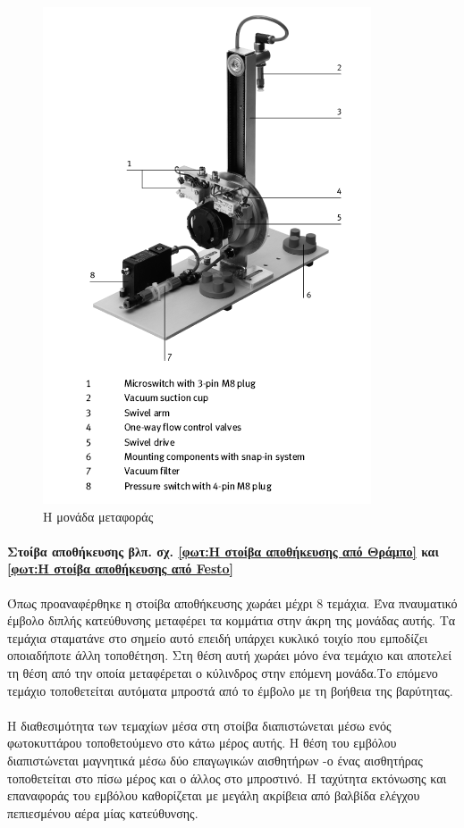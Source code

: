 \documentclass[a4paper,12pt,twoside]{report}
\begin{document}
{				\begin{figure}[hp]
					\centering
					\includegraphics[scale=0.75]{ChangerModuleParts.png}
					\caption{Η μονάδα μεταφοράς \cite{FestoChangerModuleManual}}
					\label{φωτ:Η μονάδα μεταφοράς από Festo}
				\end{figure}
							

				
				\paragraph{Στοίβα αποθήκευσης {\footnotesize βλπ. σχ. \ref{φωτ:Η στοίβα αποθήκευσης από Θράμπο} και \ref{φωτ:Η στοίβα αποθήκευσης από Festo}}} {Όπως προαναφέρθηκε η στοίβα αποθήκευσης χωράει μέχρι 8 τεμάχια. Ένα πναυματικό έμβολο διπλής κατεύθυνσης μεταφέρει τα κομμάτια στην άκρη της μονάδας αυτής. Τα τεμάχια σταματάνε στο σημείο αυτό επειδή υπάρχει κυκλικό τοιχίο που εμποδίζει οποιαδήποτε άλλη τοποθέτηση. Στη θέση αυτή χωράει μόνο ένα τεμάχιο και αποτελεί τη θέση από την οποία μεταφέρεται ο κύλινδρος στην επόμενη μονάδα.Το επόμενο τεμάχιο τοποθετείται αυτόματα μπροστά από το έμβολο με τη βοήθεια της βαρύτητας.
				}
				\paragraph{} {Η διαθεσιμότητα των τεμαχίων μέσα στη στοίβα διαπιστώνεται μέσω ενός φωτοκυττάρου τοποθετούμενο στο κάτω μέρος αυτής. Η θέση του εμβόλου διαπιστώνεται μαγνητικά μέσω δύο επαγωγικών αισθητήρων -ο ένας αισθητήρας τοποθετείται στο πίσω μέρος και ο άλλος στο μπροστινό. Η ταχύτητα εκτόνωσης και επαναφοράς του εμβόλου καθορίζεται με μεγάλη ακρίβεια από \gls{βαλβίδα ελέγχου πεπιεσμένου αέρα μίας κατεύθυνσης}.
				}

}
\end{document}
